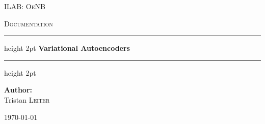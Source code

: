 \documentclass{report}\usepackage[]{graphicx}\usepackage[]{xcolor}
\begin{document}
\begin{titlepage}
    \centering
    
    {\scshape\LARGE ILAB: OeNB \par}
    \vspace{1cm}
    {\scshape\Large Documentation \par}
    
    \vspace{2.5cm}
    
    \hrule height 2pt
    \vspace{0.5cm}
    { \huge \bfseries Variational Autoencoders \\}
    \vspace{0.5cm}
    \hrule height 2pt
    
    \vspace{2cm}
    
    \Large
    \textbf{Author:} \\
    Tristan \textsc{Leiter}
    
    \vspace{1.5cm}
    
    \normalsize
    \today

    \vfill
    
\end{titlepage}
\restoregeometry





\tableofcontents
\newpage

\end{document}
